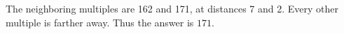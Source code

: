 The neighboring multiples are 162 and 171, at distances 7 and 2. Every other multiple is farther away. Thus the answer is $\boxed{171}$.
